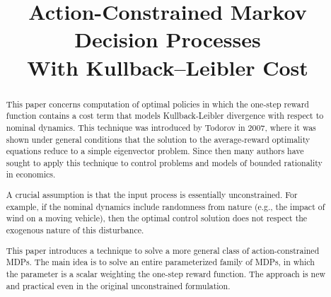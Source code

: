 \documentclass[final,12pt]{colt2018} %
\title[MDPs with K-L Cost]{Action-Constrained Markov Decision Processes 
  \\
  With Kullback--Leibler Cost}
\def\rd#1{{\color{red}#1}}
\begin{document}
\maketitle

%





\begin{abstract}

This paper concerns computation of optimal policies in which the one-step reward function contains a cost term that models Kullback-Leibler divergence with respect to nominal dynamics. This technique was introduced by Todorov in 2007, where it was shown under general conditions that the solution to the average-reward optimality equations reduce to a simple eigenvector problem. Since then many authors have sought to apply this technique to control problems and models of bounded rationality in economics. 

A crucial assumption is that the input process is essentially unconstrained. For example, if the nominal dynamics include randomness from nature (e.g., the impact of wind on a moving vehicle), then the optimal control solution does not respect the exogenous nature of this disturbance. 

This paper introduces a technique to solve a more general class of action-constrained MDPs. The main idea is to solve an entire parameterized family of MDPs, in which the parameter is a scalar weighting the one-step  reward function. The approach is new and practical even in the original unconstrained formulation.


%
%
%
%
% 
%

\end{abstract}
\end{document}
